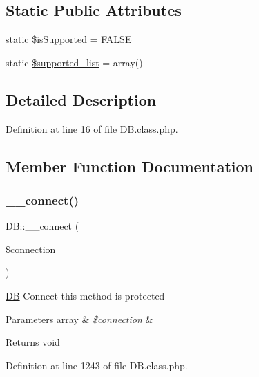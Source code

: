 \subsection*{Static Public Attributes}
\begin{DoxyCompactItemize}
\item 
static \hyperlink{classDB_a6b693edbdcdce5c86f42c050f62d8136}{\$is\+Supported} = F\+A\+L\+SE
\item 
static \hyperlink{classDB_ac09dd547a22963632e063c9ab68b7707}{\$supported\+\_\+list} = array()
\end{DoxyCompactItemize}


\subsection{Detailed Description}


Definition at line 16 of file D\+B.\+class.\+php.



\subsection{Member Function Documentation}
\mbox{\label{classDB_a398b5d8142cab5920d3e037b4f22830e}} 
\subsubsection{\texorpdfstring{\+\_\+\+\_\+connect()}{\_\_connect()}}
{\footnotesize\ttfamily D\+B\+::\+\_\+\+\_\+connect (\begin{DoxyParamCaption}\item[{}]{\$connection }\end{DoxyParamCaption})}

\hyperlink{classDB}{DB} Connect this method is protected 
\begin{DoxyParams}[1]{Parameters}
array & {\em \$connection} & \\
\hline
\end{DoxyParams}
\begin{DoxyReturn}{Returns}
void 
\end{DoxyReturn}


Definition at line 1243 of file D\+B.\+class.\+php.

\mbox{\label{classDB_a9e93ad499d34fefc40686d35ed9bf18f}} 
